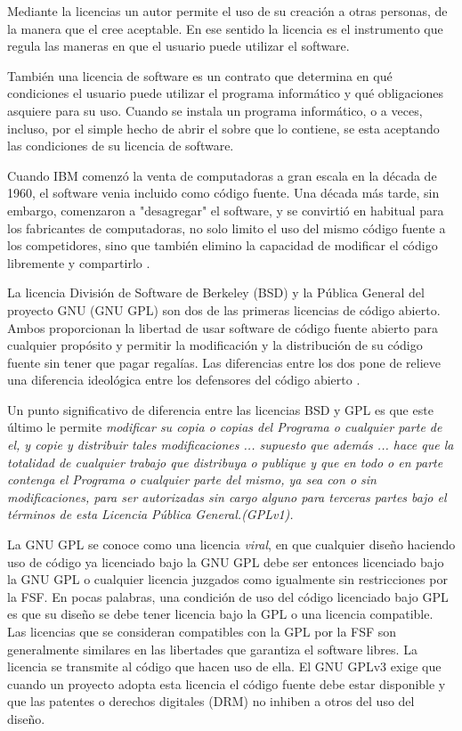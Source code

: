 Mediante la licencias un autor permite el uso de su creación a otras personas, de la manera que el cree aceptable. En ese sentido la licencia es el instrumento que regula las maneras en que el usuario puede utilizar el software.

También una licencia de software es un contrato que determina en qué condiciones el usuario puede utilizar el programa informático y qué obligaciones asquiere para su uso. Cuando se instala un programa informático, o a veces, incluso, por el simple hecho de abrir el sobre que lo contiene, se esta aceptando las condiciones de su licencia de software.

Cuando IBM comenzó la venta de computadoras a gran escala en la década de 1960, el software venia incluido como código fuente. Una década más tarde, sin embargo, comenzaron a "desagregar"  el software, y se convirtió en habitual para los fabricantes de computadoras, no solo limito  el uso del mismo código fuente a los competidores, sino que también elimino la capacidad de modificar el código libremente y compartirlo \cite{Etiqueta08}.  
	
La licencia División de Software de Berkeley (BSD) y la Pública General del proyecto GNU (GNU GPL) son dos de las primeras licencias de código abierto. Ambos proporcionan la libertad de usar software de código fuente abierto para cualquier propósito y permitir la modificación y la distribución de su código fuente sin tener que pagar regalías. Las diferencias entre los dos pone de relieve una diferencia ideológica entre los defensores del código abierto .

Un punto significativo de diferencia entre las licencias BSD y GPL es que este último le permite
\textit{modificar su copia o copias del Programa o cualquier parte de el, y copie
y distribuir tales modificaciones ... supuesto que además ... hace que la
totalidad de cualquier trabajo que distribuya o publique y que en todo o en
parte contenga el Programa o cualquier parte del mismo, ya sea con o sin
modificaciones, para ser autorizadas sin cargo alguno para terceras partes bajo el
términos de esta Licencia Pública General.(GPLv1).} \cite{Etiqueta09}

La GNU GPL se conoce como una licencia \textit{viral}, en que cualquier diseño haciendo uso de código ya licenciado bajo la GNU GPL debe ser entonces licenciado bajo la
GNU GPL o cualquier licencia juzgados como igualmente sin restricciones por la FSF. En pocas palabras, una condición de uso del código licenciado bajo GPL es que su diseño se debe tener licencia bajo la GPL o una licencia compatible. Las licencias que se consideran compatibles con la GPL por la FSF son generalmente similares en las libertades que garantiza el software libres. La licencia se transmite al código que hacen uso de ella. El GNU GPLv3 exige que cuando un proyecto adopta esta licencia el código fuente debe estar disponible y que las patentes o derechos digitales (DRM) no inhiben a otros del uso del diseño. 

